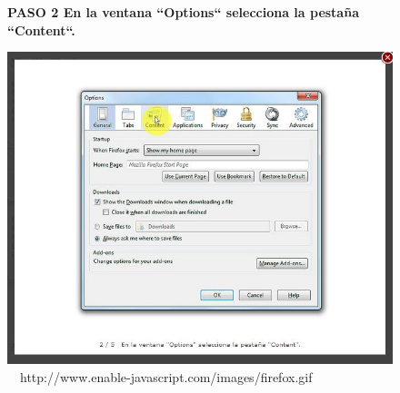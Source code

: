 \documentclass[11pt]{article} %
\begin{document}
\begin{figure}
\begin{center}
\begin{center}
\bf PASO 2
En la ventana ``Options`` selecciona la pestaña ``Content``.
\end{center}

\includegraphics[height=8 cm, width=8 cm] {imagenes/firefox 02.JPG}
\newline
\newline
\
\  {http://www.enable-javascript.com/images/firefox.gif }

\end{center}
\end{figure}
\end{document}
